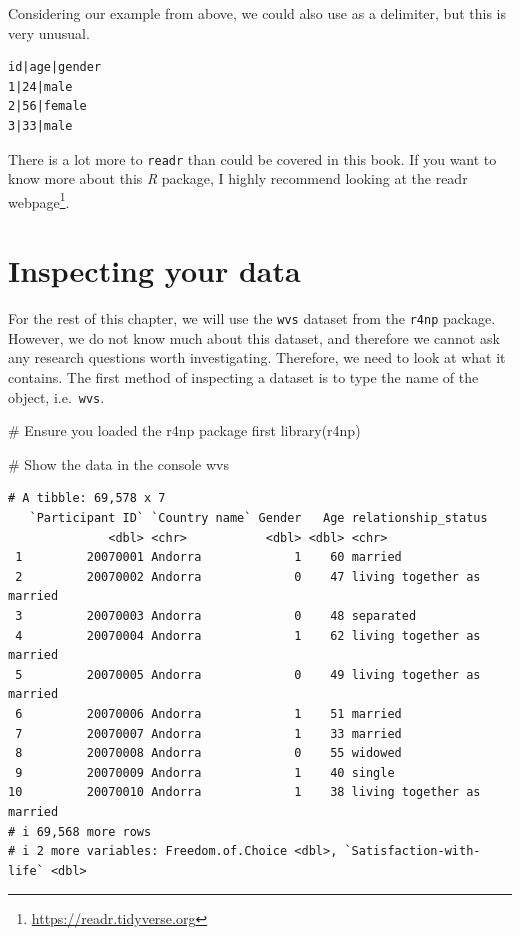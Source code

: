 \documentclass[
  letterpaper,
]{krantz}
\makeatletter
\newenvironment{Shaded}{\begin{snugshade}}{\end{snugshade}}
\newcommand{\CommentTok}[1]{\textcolor[rgb]{0.37,0.37,0.37}{#1}}
\newcommand{\FunctionTok}[1]{\textcolor[rgb]{0.28,0.35,0.67}{#1}}
\newcommand{\NormalTok}[1]{\textcolor[rgb]{0.00,0.23,0.31}{#1}}
\renewcommand{\href}[2]{#2\footnote{\url{#1}}}
\newenvironment{kframe}{%
\medskip{}
\setlength{\fboxsep}{.8em}
 \def\at@end@of@kframe{}%
 \ifinner\ifhmode%
  \def\at@end@of@kframe{\end{minipage}}%
  \begin{minipage}{\columnwidth}%
 \fi\fi%
 \def\FrameCommand##1{\hskip\@totalleftmargin \hskip-\fboxsep
 \colorbox{shadecolor}{##1}\hskip-\fboxsep
     \hskip-\linewidth \hskip-\@totalleftmargin \hskip\columnwidth}%
 \MakeFramed {\advance\hsize-\width
   \@totalleftmargin\z@ \linewidth\hsize
   \@setminipage}}%
 {\par\unskip\endMakeFramed%
 \at@end@of@kframe}
\renewenvironment{Shaded}{\begin{kframe}}{\end{kframe}}
\makeatother
\begin{document}
Considering our example from above, we could also use
\texttt{\textbar{}} as a delimiter, but this is very unusual.

\begin{verbatim}
id|age|gender
1|24|male
2|56|female
3|33|male
\end{verbatim}

There is a lot more to \texttt{readr} than could be covered in this
book. If you want to know more about this \emph{R} package, I highly
recommend looking at the \href{https://readr.tidyverse.org}{readr
webpage}.

\section{Inspecting your data}\label{inspecting-raw-data}

For the rest of this chapter, we will use the \texttt{wvs} dataset from
the \texttt{r4np} package. However, we do not know much about this
dataset, and therefore we cannot ask any research questions worth
investigating. Therefore, we need to look at what it contains. The first
method of inspecting a dataset is to type the name of the object,
i.e.~\texttt{wvs}.

\begin{Shaded}
\begin{Highlighting}[]
\CommentTok{\# Ensure you loaded the \textquotesingle{}r4np\textquotesingle{} package first}
\FunctionTok{library}\NormalTok{(r4np)}

\CommentTok{\# Show the data in the console}
\NormalTok{wvs}
\end{Highlighting}
\end{Shaded}

\begin{verbatim}
# A tibble: 69,578 x 7
   `Participant ID` `Country name` Gender   Age relationship_status       
              <dbl> <chr>           <dbl> <dbl> <chr>                     
 1         20070001 Andorra             1    60 married                   
 2         20070002 Andorra             0    47 living together as married
 3         20070003 Andorra             0    48 separated                 
 4         20070004 Andorra             1    62 living together as married
 5         20070005 Andorra             0    49 living together as married
 6         20070006 Andorra             1    51 married                   
 7         20070007 Andorra             1    33 married                   
 8         20070008 Andorra             0    55 widowed                   
 9         20070009 Andorra             1    40 single                    
10         20070010 Andorra             1    38 living together as married
# i 69,568 more rows
# i 2 more variables: Freedom.of.Choice <dbl>, `Satisfaction-with-life` <dbl>
\end{verbatim}
\end{document}
